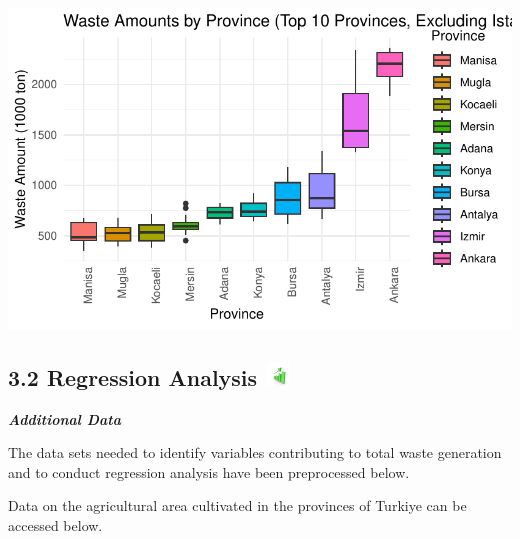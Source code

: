 \documentclass[
  11pt,
  a4paper,
  DIV=11,
  numbers=noendperiod]{scrartcl}
\begin{document}
\includegraphics{project_files/figure-pdf/unnamed-chunk-27-1.pdf}

\subsection[{3.2 Regression Analysis} ]{\texorpdfstring{{3.2 Regression
Analysis}
\protect\includegraphics[width=0.27083in,height=0.23958in]{assets/images/tredn.jpg}}{3.2 Regression Analysis }}\label{regression-analysis}

\textbf{\emph{Additional Data}}

The data sets needed to identify variables contributing to total waste
generation and to conduct regression analysis have been preprocessed
below.

Data on the {agricultural area} cultivated in the provinces of Turkiye
can be accessed below.
\end{document}
